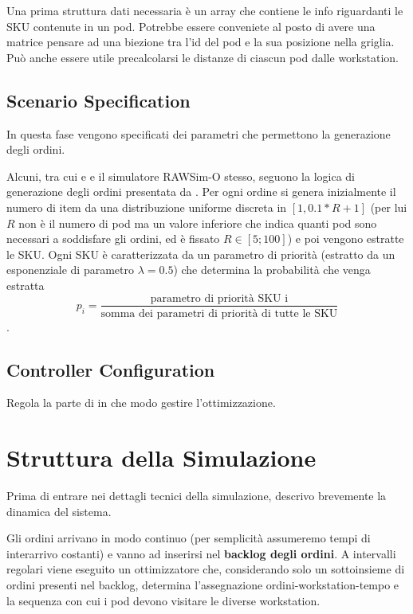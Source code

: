 \documentclass{article}
\begin{document}
Una prima struttura dati necessaria è un array che contiene le info riguardanti le SKU contenute in un pod.
Potrebbe essere conveniete al posto di avere una matrice pensare ad una biezione tra l'id del pod e la sua posizione nella griglia. \\
Può anche essere utile precalcolarsi le distanze di ciascun pod dalle workstation.


\subsection{Scenario Specification} \label{SS}
In questa fase vengono specificati dei parametri che permettono la generazione degli ordini.

Alcuni, tra cui \cite{Jiao2023} e \cite{Justkowiak2023} e il simulatore RAWSim-O stesso, seguono la logica di generazione degli ordini presentata da \cite{BOYSEN2017550}. Per ogni ordine si genera inizialmente il numero di item da una distribuzione uniforme discreta in $[1, 0.1*R+1]$ (per lui $R$ non è il numero di pod ma un valore inferiore che indica quanti pod sono necessari a soddisfare gli ordini, ed è fissato $R \in [5; 100]$) e poi vengono estratte le SKU. Ogni SKU è caratterizzata da un parametro di priorità (estratto da un esponenziale di parametro $\lambda = 0.5$) che determina la probabilità che venga estratta \[p_i = \frac{\text{parametro di priorità SKU i}}{\text{somma dei parametri di priorità di tutte le SKU}}\].


\subsection{Controller Configuration}
Regola la parte di in che modo gestire l'ottimizzazione.

\medskip
\section{Struttura della Simulazione}
Prima di entrare nei dettagli tecnici della simulazione, descrivo brevemente la dinamica del sistema.

Gli ordini arrivano in modo continuo (per semplicità assumeremo tempi di interarrivo costanti) e vanno ad inserirsi nel \textbf{backlog degli ordini}. A intervalli regolari viene eseguito un ottimizzatore che, considerando solo un sottoinsieme di ordini presenti nel backlog, determina l'assegnazione ordini-workstation-tempo e la sequenza con cui i pod devono visitare le diverse workstation.
\end{document}
